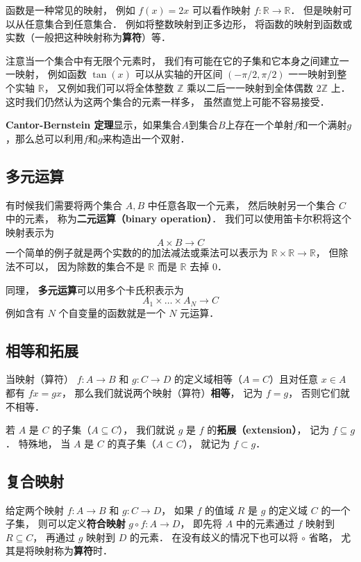 函数是一种常见的映射， 例如 $f(x) = 2x$ 可以看作映射 $f: \mathbb R \to \mathbb R$． 但是映射可以从任意集合到任意集合． 例如将整数映射到正多边形， 将函数的映射到函数或实数（一般把这种映射称为\textbf{算符}）等．

注意当一个集合中有无限个元素时， 我们有可能在它的子集和它本身之间建立一一映射， 例如函数 $\tan(x)$ 可以从实轴的开区间 $(-\pi/2, \pi/2)$ 一一映射到整个实轴 $\mathbb R$， 又例如我们可以将全体整数 $\mathbb Z$ 乘以二后一一映射到全体偶数 $2\mathbb Z$ 上． 这时我们仍然认为这两个集合的元素一样多， 虽然直觉上可能不容易接受．

\textbf{Cantor-Bernstein 定理}显示，如果集合$A$到集合$B$上存在一个单射$f$和一个满射$g$，那么总可以利用$f$和$g$来构造出一个双射．

\subsection{多元运算}
有时候我们需要将两个集合 $A, B$ 中任意各取一个元素， 然后映射另一个集合 $C$ 中的元素， 称为\textbf{二元运算（binary operation）}． 我们可以使用笛卡尔积将这个映射表示为
\begin{equation}\label{map_eq1}
A \times B \to C
\end{equation}
一个简单的例子就是两个实数的的加法减法或乘法可以表示为 $\mathbb R \times \mathbb R \to \mathbb R$， 但除法不可以， 因为除数的集合不是 $\mathbb R$ 而是 $\mathbb R$ 去掉 $0$．

同理， \textbf{多元运算}可以用多个卡氏积表示为
\begin{equation}
A_1 \times \dots \times A_N \to C
\end{equation}
例如含有 $N$ 个自变量的函数就是一个 $N$ 元运算．

\subsection{相等和拓展}
当映射（算符） $f:A\to B$ 和 $g:C\to D$ 的定义域相等（$A = C$）且对任意 $x\in A$ 都有 $fx = gx$， 那么我们就说两个映射（算符）\textbf{相等}， 记为 $f = g$， 否则它们就不相等．

若 $A$ 是 $C$ 的子集（$A\subseteq C$）， 我们就说 $g$ 是 $f$ 的\textbf{拓展（extension）}， 记为 $f \subseteq g$． 特殊地， 当 $A$ 是 $C$ 的真子集（$A\subset C$）， 就记为 $f \subset g$．

\subsection{复合映射}
给定两个映射 $f:A\to B$ 和 $g:C\to D$， 如果 $f$ 的值域 $R$ 是 $g$ 的定义域 $C$ 的一个子集， 则可以定义\textbf{符合映射} $g\circ f: A\to D$， 即先将 $A$ 中的元素通过 $f$ 映射到 $R \subseteq C$， 再通过 $g$ 映射到 $D$ 的元素． 在没有歧义的情况下也可以将 $\circ$ 省略， 尤其是将映射称为\textbf{算符}时．

